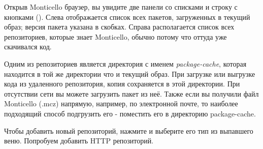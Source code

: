 \documentclass[a4paper,10pt,twoside]{book}
\begin{document}

Открыв Monticello браузер, вы увидите две панели со списками и строку с кнопками (). Слева отображается список всех пакетов, загруженных в текущий образ; версия пакета указана в скобках. Справа располагается список всех репозиториев, которые знает Monticello, обычно потому что оттуда уже скачивался код.


Одним из репозиториев является директория с именем \emph{package-cache}, которая находится в той же директории что и текущий образ. При загрузке или выгрузке кода из удаленного репозитория, копия сохраняется в этой директории. При отсутствии сети вы можете загрузить пакет из неё. Также если вы получили файл  Monticello (.mcz) напрямую, например, по электронной почте, то наиболее подходящий способ подгрузить его - поместить его в директорию package-cache.

Чтобы добавить новый репозиторий, нажмите  и выберите его тип из выпавшего веню. Попробуем добавить HTTP репозиторий.

\end{document}
